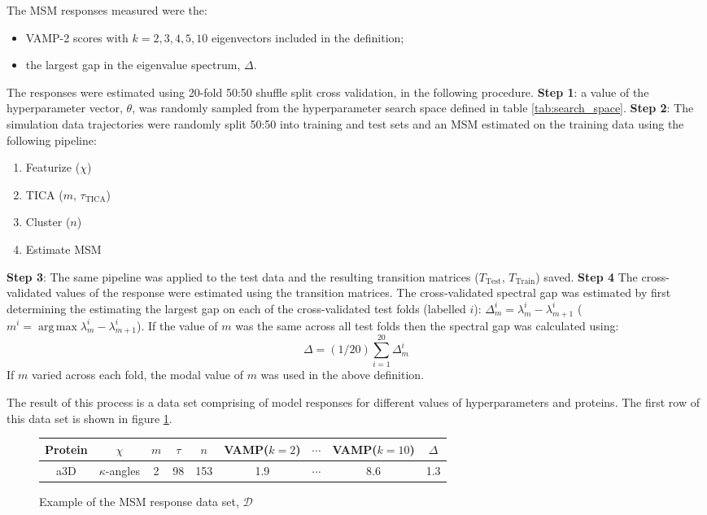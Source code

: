 \documentclass{article}
\DeclareMathOperator*{\argmax}{arg\,max}
\begin{document}
The MSM responses measured were the:
\begin{itemize}
    \item VAMP-2 scores with $k = 2, 3, 4, 5, 10$ eigenvectors included in the definition; 
    \item the largest gap in the eigenvalue spectrum, $\Delta$. 
\end{itemize}

The responses were estimated using 20-fold 50:50 shuffle split cross validation, in the following procedure. \textbf{Step 1}: a value of the hyperparameter vector, $\theta$, was randomly sampled from the hyperparameter search space defined in table \ref{tab:search_space}. \textbf{Step 2}: The simulation data trajectories were randomly split 50:50 into training and test sets and an MSM estimated on the training data using the following pipeline: 
\begin{enumerate}
\item Featurize ($\chi$)
\item TICA ($m$, $\tau_{\mathrm{TICA}}$)
\item Cluster ($n$)
\item Estimate MSM
\end{enumerate}
\textbf{Step 3}: The same pipeline was applied to the test data and the resulting transition matrices ($T_{\mathrm{Test}}$, $T_{\mathrm{Train}}$) saved. \textbf{Step 4} The cross-validated values of the response were estimated using the transition matrices. The cross-validated spectral gap was estimated by first determining the estimating the largest gap on each of the cross-validated test folds (labelled $i$):  $\Delta^{i}_{m} = \lambda^{i}_{m} - \lambda^{i}_{m+1}$ ($m^{i} = \argmax{\lambda^{i}_{m} - \lambda^{i}_{m+1}}$). If the value of $m$ was the same across all test folds then the spectral gap was calculated using: 
\begin{equation}
    \Delta = (1/20)\sum_{i=1}^{20}\Delta^{i}_{m}
\end{equation}
If $m$ varied across each fold, the modal value of $m$ was used in the above definition. 

The result of this process is a data set comprising of model responses for different values of hyperparameters and proteins. The first row of this data set is shown in figure \ref{fig:example_data}. 
\begin{figure}
    \centering
    \begin{tabular}{ccccccccc}
        \toprule
        Protein & $\chi$    & $m$ & $\tau$ &  $n$ & VAMP($k=2$) & $\cdots$  & VAMP($k=10$) & $\Delta$ \\
        \midrule
        a3D & $\kappa$-angles & 2 & 98 & 153 & 1.9 & $\cdots$ & 8.6 & 1.3 \\
        \bottomrule
    \end{tabular}
    \caption{Example of the MSM response data set, $\mathcal{D}$}\label{fig:example_data}
\end{figure}
\end{document}
